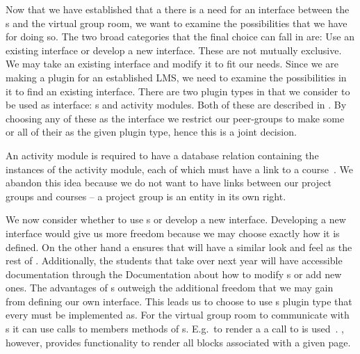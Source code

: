 Now that we have established that a there is a need for an interface between the \detdeandrelaver[]s and the virtual group room, we want to examine the possibilities that we have for doing so.
The two broad categories that the final choice can fall in are: Use an existing interface or develop a new interface.
These are not mutually exclusive.
We may take an existing interface and modify it to fit our needs.
Since we are making a plugin for an established LMS, we need to examine the possibilities in it to find an existing interface.
There are two plugin types in \moodle{} that we consider to be used as interface: \block{}s and activity modules.
Both of these are described in .
By choosing any of these as the interface we restrict our peer-groups to make some or all of their \subsystem{} as the given plugin type, hence this is a joint decision.

An activity module is required to have a database relation containing the instances of the activity module, each of which must have a link to a course~\cite{moodleactivitymodule}.
We abandon this idea because we do not want to have links between our project groups and courses -- a project group is an entity in its own right.

We now consider whether to use \block{}s or develop a new interface.
Developing a new interface would give us more freedom because we may choose exactly how it is defined.
On the other hand a \block{} ensures that \system{} will have a similar look and feel as the rest of \moodle{}.
Additionally, the students that take over next year will have accessible documentation through the \moodle{} Documentation about how to modify \detdeandrelaver[]s or add new ones.
The advantages of \block{}s outweigh the additional freedom that we may gain from defining our own interface.
This leads us to choose to use \block{}s plugin type that every \detdeandrelaver{} must be implemented as.
For the virtual group room to communicate with \detdeandrelaver[]s it can use calls to members methods of \block{}s.
E.g.\ to render a \block{} a call to  is used~\cite{moodleblockapp}.
\moodle{}, however, provides functionality to render all blocks associated with a given page.


